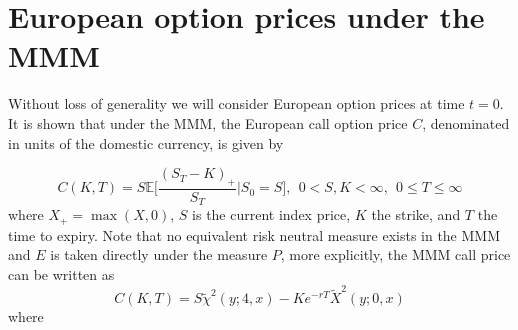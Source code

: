 \documentclass[a4 paper, 12pt]{report}
\theoremstyle{plain}
\begin{document}
%
%
%
%
%
%
%
%
%
%
%
%
%
%
%
%
%
%
%
%
%
%
%
%
%
%
%
%
%
%
%
%
%
%
%
%
%





\section{European option prices under the MMM}
\noindent
\par Without loss of generality we will consider European option prices at time $t = 0$. It is shown that under the MMM, the European call option price $C$, denominated in units of the domestic currency, is given by 



\begin{equation}\label{neww1}
C(K,T) = S\mathbb{E}\bigg[\frac{(S_T - K)_+}{S_T}\bigg|S_0 = S\bigg],~~0<S,K<\infty,~~0\leq T\leq \infty
\end{equation}
where $X_+ = \max(X, 0)$, $S$ is the current index price, $K$ the strike, and $T$ the time to expiry.
Note that no equivalent risk neutral measure exists in the MMM and $E$ is taken directly
under the measure $P$, more explicitly, the MMM call price can be
written as
\begin{equation}\label{neww2}
C(K,T) = S\tilde{\chi}^2(y;4,x) - Ke^{-rT}\tilde{X}^2(y;0,x)
\end{equation}
where 
\end{document}
